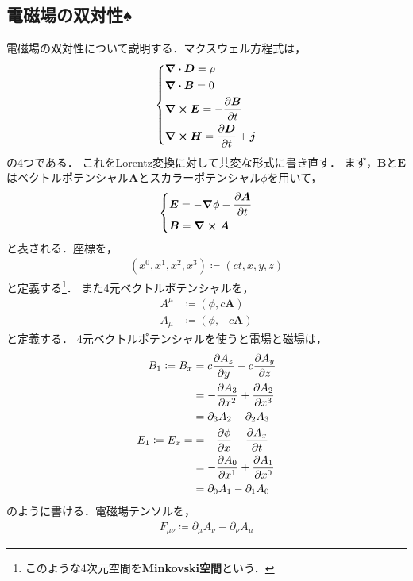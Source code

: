 \documentclass{report}
\begin{document}
  \subsection{電磁場の双対性♠}
    電磁場の双対性について説明する．マクスウェル方程式は，
    \begin{align}
      \begin{dcases}
        \div \bm{D} = \rho \\
        \div \bm{B} = 0 \\
        \curl \bm{E} = - \pdv{\bm{B}}{t} \\
        \curl \bm{H} = \pdv{\bm{D}}{t} + \bm{j}
      \end{dcases}
    \end{align}
    の4つである．
    これをLorentz変換に対して共変な形式に書き直す．
    まず，$\bm{B}$と$\bm{E}$はベクトルポテンシャル$\bm{A}$とスカラーポテンシャル$\phi$を用いて，
    \begin{align}
      \begin{dcases}
        \bm{E} = -\grad \phi - \pdv{\bm{A}}{t} \\
        \bm{B} = \curl \bm{A}
      \end{dcases}
    \end{align}
    と表される．座標を，
    \begin{align}
      (x^0, x^1, x^2, x^3) \coloneqq (ct, x, y, z)
    \end{align}
    と定義する\footnote{
      このような4次元空間を\textbf{Minkovski空間}という． 
    }．
    また4元ベクトルポテンシャルを，
    \begin{align}
      A^{\mu} &\coloneqq (\phi, c\bm{A}) \\
      A_{\mu} &\coloneqq (\phi, -c\bm{A})
    \end{align}
    と定義する．
    4元ベクトルポテンシャルを使うと電場と磁場は，
    \begin{align}
      B_1 \coloneqq B_x &= c\pdv{A_z}{y} - c\pdv{A_y}{z} \\
      &= -\pdv{A_3}{x^2}  + \pdv{A_2}{x^3} \\
      &= \partial_3 A_2 - \partial_2 A_3\\
      E_1 \coloneqq E_x = &= -\pdv{\phi}{x} - \pdv{A_x}{t} \\
      &= -\pdv{A_0}{x^1} + \pdv{A_1}{x^0} \\
      &= \partial_0 A_1 - \partial_1 A_0
    \end{align}
    のように書ける．電磁場テンソルを，
    \begin{align}
      F_{\mu\nu} \coloneqq \partial_{\mu}A_{\nu} - \partial_{\nu} A_{\mu}
    \end{align}
\end{document}

